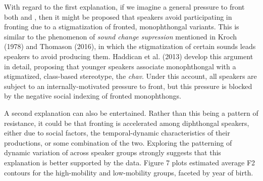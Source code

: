 \documentclass[12pt]{article}
\begin{document}
With regard to the first explanation, if we imagine a general pressure to front both  and , then it might be proposed that speakers avoid participating in  fronting due to a stigmatization of fronted, monophthongal variants. This is similar to the phenomenon of \textit{sound change supression} mentioned in Kroch (1978) and Thomason (2016), in which the stigmatization of certain sounds leads speakers to avoid producing them. Haddican et al. (2013) develop this argument in detail, proposing that younger speakers associate monophthongal  with a stigmatized, class-based stereotype, the \textit{chav}. Under this account, all speakers are subject to an internally-motivated pressure to front, but this pressure is blocked by the negative social indexing of fronted monophthongs.

A second explanation can also be entertained. Rather than this being a pattern of resistance, it could be that fronting is accelerated among diphthongal speakers, either due to social factors, the temporal-dynamic characteristics of their  productions, or some combination of the two. Exploring the patterning of dynamic variation of  across speaker groups strongly suggests that this explanation is better supported by the data. Figure 7 plots estimated average F2 contours for the high-mobility and low-mobility groups, faceted by year of birth.
\end{document}
